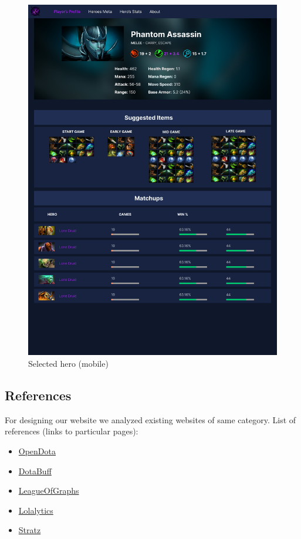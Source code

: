 \begin{figure}[ht]
\begin{minipage}[t]{0.48\textwidth}
            \centering
            \includegraphics[width=\textwidth]{images/SelectedHero_m}
            \caption{Selected hero (mobile)}
        \end{minipage}
    \end{figure}



    \subsection{References}
        For designing our website we analyzed existing websites of same category.
        List of references (links to particular pages):
        \begin{itemize}
            \item \href{https://www.opendota.com/heroes/public}{OpenDota}
            \item \href{https://www.dotabuff.com/esports/players/321580662-yatoro}{DotaBuff}
            \item \href{https://www.leagueofgraphs.com/summoner/ru/L9+Capybara-ff15}{LeagueOfGraphs}
            \item \href{https://lolalytics.com/de/lol/katarina/build/}{Lolalytics}
            \item \href{https://stratz.com/players/ranks}{Stratz}
        \end{itemize}


